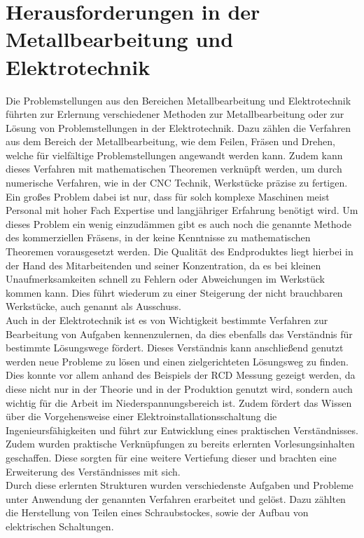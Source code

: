 \section{Herausforderungen in der Metallbearbeitung und Elektrotechnik}

Die Problemstellungen aus den Bereichen Metallbearbeitung und Elektrotechnik führten zur Erlernung verschiedener Methoden zur Metallbearbeitung oder zur 
Lösung von Problemstellungen in der Elektrotechnik. Dazu zählen die Verfahren aus dem Bereich der Metallbearbeitung, wie \zB dem Feilen, Fräsen und Drehen, 
welche für vielfältige Problemstellungen angewandt werden kann. Zudem kann dieses Verfahren mit mathematischen Theoremen verknüpft werden, um \zB durch 
numerische Verfahren, wie in der CNC Technik, Werkstücke präzise zu fertigen. Ein großes Problem dabei ist nur, dass für solch komplexe Maschinen meist 
Personal mit hoher Fach Expertise und langjähriger Erfahrung benötigt wird. Um dieses Problem ein wenig einzudämmen gibt es auch noch die genannte Methode 
des kommerziellen Fräsens, in der keine Kenntnisse zu mathematischen Theoremen vorausgesetzt werden. Die Qualität des Endproduktes liegt hierbei in der 
Hand des Mitarbeitenden und seiner Konzentration, da es bei kleinen Unaufmerksamkeiten schnell zu Fehlern oder Abweichungen im Werkstück kommen kann. Dies 
führt wiederum zu einer Steigerung der nicht brauchbaren Werkstücke, auch genannt als Ausschuss.
\\
Auch in der Elektrotechnik ist es von Wichtigkeit bestimmte Verfahren zur Bearbeitung von Aufgaben kennenzulernen, da dies ebenfalls das Verständnis für 
bestimmte Lösungswege fördert. Dieses Verständnis kann anschließend genutzt werden neue Probleme zu lösen und einen zielgerichteten Lösungsweg zu finden. 
Dies konnte vor allem anhand des Beispiels der RCD Messung gezeigt werden, da diese nicht nur in der Theorie und in der Produktion genutzt wird, sondern 
auch wichtig für die Arbeit im Niederspannungsbereich ist. Zudem fördert das Wissen über die Vorgehensweise einer Elektroinstallationsschaltung die 
Ingenieursfähigkeiten und führt zur Entwicklung eines praktischen Verständnisses. Zudem wurden praktische Verknüpfungen zu bereits erlernten 
Vorlesungsinhalten geschaffen. Diese sorgten für eine weitere Vertiefung dieser und brachten eine Erweiterung des Verständnisses mit sich.
\\
Durch diese erlernten Strukturen wurden verschiedenste Aufgaben und Probleme unter Anwendung der genannten Verfahren erarbeitet und gelöst. Dazu 
zählten \zB die Herstellung von Teilen eines Schraubstockes, sowie der Aufbau von elektrischen Schaltungen.


\clearpage